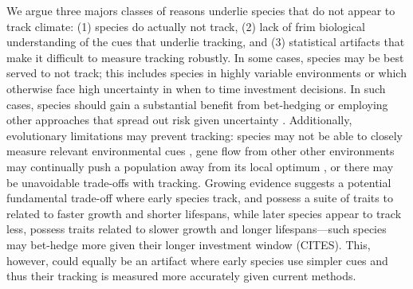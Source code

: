 \documentclass[11pt,letterpaper]{article}
\begin{document}
We argue three majors classes of reasons underlie species that do not appear to track climate: (1) species do actually not track, (2) lack of frim biological understanding of the cues that underlie tracking, and (3) statistical artifacts that make it difficult to measure tracking robustly. In some cases, species may be best served to not track; this includes species in highly variable environments or which otherwise face high uncertainty in when to time investment decisions. In such cases, species should gain a substantial benefit from bet-hedging or employing other approaches that spread out risk given uncertainty \citep{Venable:2007os,donald2013}. Additionally, evolutionary limitations may prevent tracking: species may not be able to closely measure relevant environmental cues \citep{arnold1992,Singer:2010eb}, gene flow from other other environments may continually push a population away from its local optimum \citep{lenormand2002}, or there may be unavoidable trade-offs \citep{levins1968} with tracking.  Growing evidence suggests a potential fundamental trade-off where early species track, and possess a suite of traits to related to faster growth and shorter lifespans, while later species appear to track less, possess traits related to slower growth and longer lifespans---such species may bet-hedge more given their longer investment window (CITES). This, however, could equally be an artifact where early species use simpler cues and thus their tracking is measured more accurately given current methods. 
\end{document}

